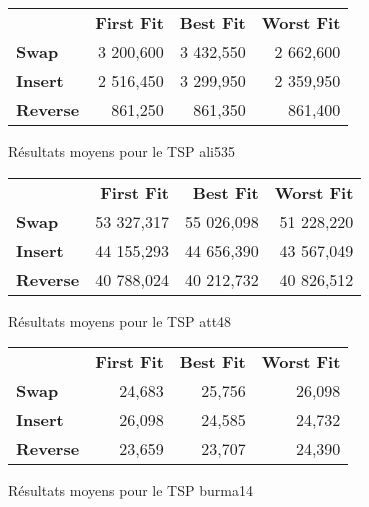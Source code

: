 \documentclass[a4paper,10pt]{report}
\begin{document}
\begin{center}
  \begin{figure}[h]
    \begin{tabular}{lrrr}
      &		\textbf{First Fit}&	\textbf{Best Fit}&	\textbf{Worst Fit}\\
      \textbf{Swap}&	3 200,600&	3 432,550&		2 662,600\\
      \textbf{Insert}&	2 516,450&	3 299,950&		2 359,950\\
      \textbf{Reverse}&	861,250&	861,350&		861,400\\
    \end{tabular}
    \label{ali535-results}
    \caption{Résultats moyens pour le TSP ali535}
  \end{figure}
\end{center}

\begin{center}
  \begin{figure}[h]
    \begin{tabular}{lrrr}
      &		\textbf{First Fit}&	\textbf{Best Fit}&	\textbf{Worst Fit}\\
      \textbf{Swap}&	53 327,317&	55 026,098&		51 228,220\\
      \textbf{Insert}&	44 155,293&	44 656,390&		43 567,049\\
      \textbf{Reverse}&	40 788,024&	40 212,732&		40 826,512\\
    \end{tabular}
    \label{att48-results}
    \caption{Résultats moyens pour le TSP att48}
  \end{figure}
\end{center}

\begin{center}
  \begin{figure}[h]
    \begin{tabular}{lrrr}
      &		\textbf{First Fit}&	\textbf{Best Fit}&	\textbf{Worst Fit}\\
      \textbf{Swap}&	24,683&		25,756&			26,098\\
      \textbf{Insert}&	26,098&		24,585&			24,732\\
      \textbf{Reverse}&	23,659&		23,707&			24,390\\
    \end{tabular}
    \label{burma14-results}
    \caption{Résultats moyens pour le TSP burma14}
  \end{figure}
\end{center}

\end{document}
